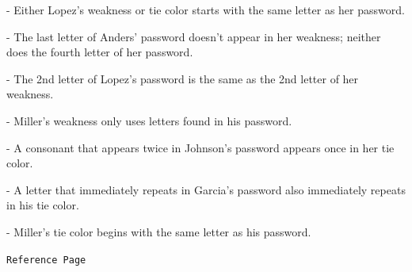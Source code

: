 \documentclass{article}
\newcommand{\puzzleTitle}[1]{
\begin{center}
{\Large \texttt{#1}}
\end{center}
}
\begin{document}
{- Either Lopez’s weakness or tie color starts with the same letter as her password.

- The last letter of Anders’ password doesn’t appear in her weakness; neither does the fourth letter of her password.

- The 2nd letter of Lopez’s password is the same as the 2nd letter of her weakness.

- Miller’s weakness only uses letters found in his password.

- A consonant that appears twice in Johnson’s password appears once in her tie color.

- A letter that immediately repeats in Garcia’s password also immediately repeats in his tie color.

- Miller’s tie color begins with the same letter as his password.
}

\newpage

\puzzleTitle{Reference Page}

\vfill
\end{document}
